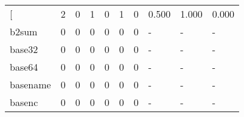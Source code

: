 \begin{longtable}{lp{1.3cm}p{1.3cm}p{1.3cm}p{1.3cm}p{1.3cm}p{1.3cm}p{1.3cm}p{1.3cm}p{1.3cm}}
\bottomrule
\endlastfoot
{[}         &                      2 &                                             0 &                                            1 &                                           0 &                                            1 &                                          0 &                                0.500 &                                  1.000 &                                0.000 \\
b2sum     &                      0 &                                             0 &                                            0 &                                           0 &                                            0 &                                          0 &                                    - &                                      - &                                    - \\
base32    &                      0 &                                             0 &                                            0 &                                           0 &                                            0 &                                          0 &                                    - &                                      - &                                    - \\
base64    &                      0 &                                             0 &                                            0 &                                           0 &                                            0 &                                          0 &                                    - &                                      - &                                    - \\
basename  &                      0 &                                             0 &                                            0 &                                           0 &                                            0 &                                          0 &                                    - &                                      - &                                    - \\
basenc    &                      0 &                                             0 &                                            0 &                                           0 &                                            0 &                                          0 &                                    - &                                      - &                                    - \\

\end{longtable}
